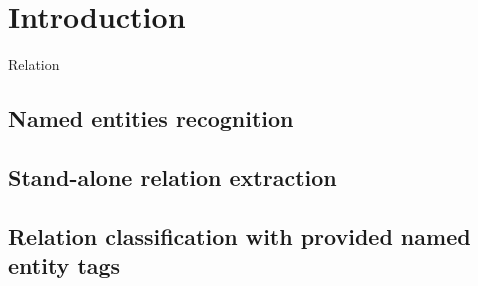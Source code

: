 \documentclass{dialogue}
\begin{document}

\section{Introduction}
Relation 
\subsection{Named entities recognition}
\subsection{Stand-alone relation extraction}
\subsection{Relation classification with provided named entity tags}

\end{document}
